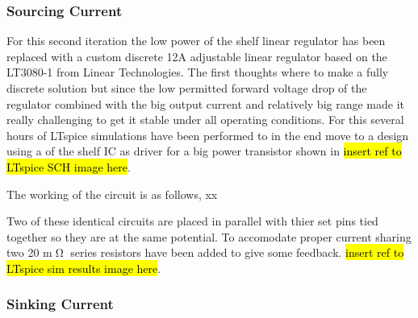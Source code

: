 \subsubsection{Sourcing Current}
For this second iteration the low power of the shelf linear regulator has been replaced with a custom discrete 12A adjustable linear regulator based on the LT3080-1 from Linear Technologies.
The first thoughts where to make a fully discrete solution but since the low permitted forward voltage drop of the regulator combined with the big output current and relatively big range made it really challenging to get it stable under all operating conditions. For this several hours of LTspice simulations have been performed to in the end move to a design using a of the shelf IC as driver for a big power transistor shown in \hl{insert ref to LTspice SCH image here}.

The working of the circuit is as follows, xx

Two of these identical circuits are placed in parallel with thier set pins tied together so they are at the same potential. To accomodate proper current sharing two 20 m$\tcohm$ series resistors have been added to give some feedback.
\hl{insert ref to LTspice sim results image here}.

\subsubsection{Sinking Current}

